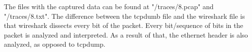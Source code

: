 The files with the captured data can be found at "/traces/8.pcap" and "/traces/8.txt".
The difference between the tcpdumb file and the wireshark file is that wireshark dissects every bit of the packet. Every bit/sequence of bits in the packet is analyzed and interpreted. As a result of that, the ethernet header is also analyzed, as opposed to tcpdump.